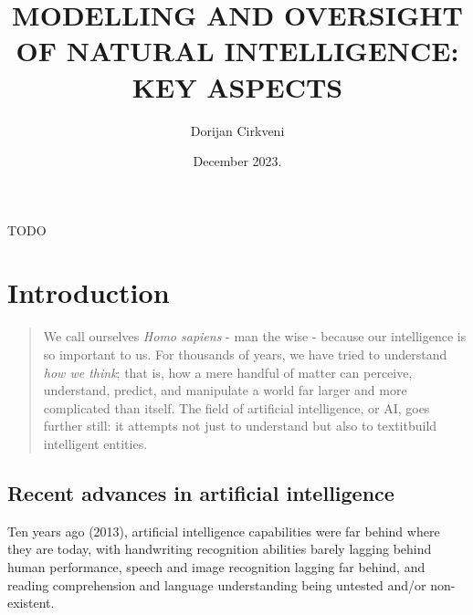 \documentclass[masterthesis]{fer}
\title{MODELLING AND OVERSIGHT OF NATURAL
INTELLIGENCE: KEY ASPECTS}
\author{Dorijan Cirkveni}
\date{December 2023.}
\begin{document}
\maketitle






\begin{zahvale}
  TODO
\end{zahvale}


\mainmatter


\tableofcontents


\chapter{Introduction}
\label{chp:introduction}
\begin{quote}
We call ourselves \textit{Homo sapiens}
- man the wise - because our intelligence is so important
to us. For thousands of years, we have tried to understand \textit{how we think};
that is, how a mere handful of matter can perceive, understand, predict, and manipulate a world far larger and
more complicated than itself. The field of artificial intelligence, or AI, goes further still: it
attempts not just to understand but also to textit{build} intelligent entities.
\cite{russell_norvig_2010}
\end{quote}
\section{Recent advances in artificial intelligence}

Ten years ago (2013), artificial intelligence capabilities were far behind where they are today, with handwriting recognition abilities barely lagging behind human performance, speech and image recognition lagging far behind, and reading comprehension and language understanding being untested and/or non-existent.
\end{document}
